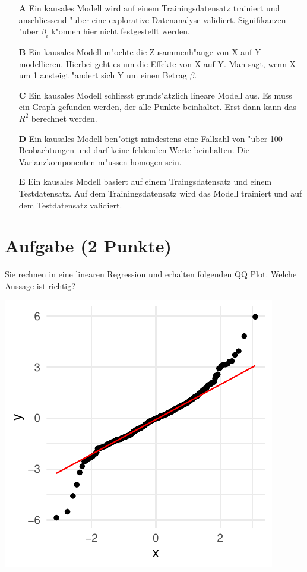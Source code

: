 \documentclass[a4paper, 9pt]{scrartcl}\usepackage[]{graphicx}\usepackage[]{xcolor}
\makeatletter
\def\maxwidth{ %
  \ifdim\Gin@nat@width>\linewidth
    \linewidth
  \else
    \Gin@nat@width
  \fi
}
\makeatother
\begin{document}
\begin{enumerate}
\item [\textbf{A} \msquare] Ein kausales Modell wird auf einem Trainingsdatensatz trainiert und anschliessend {"u}ber eine explorative Datenanalyse validiert. Signifikanzen {"u}ber $\beta_i$ k{"o}nnen hier nicht festgestellt werden.
\item [\textbf{B} \msquare] Ein kausales Modell m{"o}chte die Zusammenh{"a}nge von X auf Y modellieren. Hierbei geht es um die Effekte von X auf Y. Man sagt, wenn X um 1 ansteigt {"a}ndert sich Y um einen Betrag $\beta$.
\item [\textbf{C} \msquare] Ein kausales Modell schliesst grunds{"a}tzlich lineare Modell aus. Es muss ein Graph gefunden werden, der alle Punkte beinhaltet. Erst dann kann das $R^2$ berechnet werden.
\item [\textbf{D} \msquare] Ein kausales Modell ben{"o}tigt mindestens eine Fallzahl von {"u}ber 100 Beobachtungen und darf keine fehlenden Werte beinhalten. Die Varianzkomponenten m{"u}ssen homogen sein.
\item [\textbf{E} \msquare] Ein kausales Modell basiert auf einem Traingsdatensatz und einem Testdatensatz. Auf dem Trainingsdatensatz wird das Modell trainiert und auf dem Testdatensatz validiert.
\end{enumerate} 

\section{Aufgabe \hfill (2 Punkte)}

Sie rechnen in eine linearen Regression und erhalten folgenden QQ
Plot. Welche Aussage ist richtig?




{\centering \includegraphics[width=\maxwidth]{img/mc-regression-05-a-1} 

}
\end{document}
